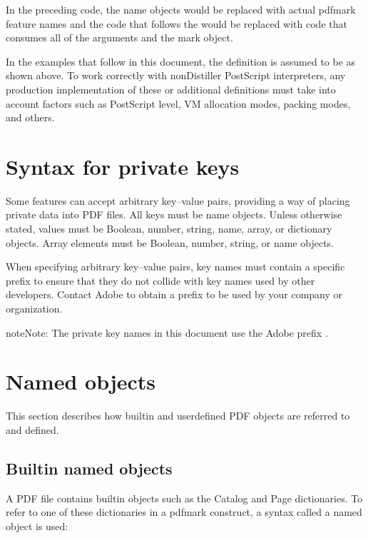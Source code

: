 \documentclass[letterpaper,12pt,english,openany,oneside]{sphinxmanual}
\begin{document}
In the preceding code, the name objects   would be replaced with actual pdfmark feature names and the code that follows the    would be replaced with code that consumes all of the arguments and the mark object.

In the examples that follow in this document, the  definition is assumed to be as shown above. To work correctly with non\sphinxhyphen{}Distiller PostScript interpreters, any production implementation of these or additional definitions must take into account factors such as PostScript level, VM allocation modes, packing modes, and others.


\section{Syntax for private keys}
\label{\detokenize{pdfmark_Syntax:syntax-for-private-keys}}
Some features can accept arbitrary key–value pairs, providing a way of placing private data into PDF files. All keys must be name objects. Unless otherwise stated, values must be Boolean, number, string, name, array, or dictionary objects. Array elements must be Boolean, number, string, or name objects.

When specifying arbitrary key–value pairs, key names must contain a specific prefix to ensure that they do not collide with key names used by other developers. Contact Adobe to obtain a prefix to be used by your company or organization.

\begin{sphinxadmonition}{note}{Note:}
The private key names in this document use the Adobe prefix  .
\end{sphinxadmonition}


\section{Named objects}
\label{\detokenize{pdfmark_Syntax:named-objects}}
This section describes how built\sphinxhyphen{}in and user\sphinxhyphen{}defined PDF objects are referred to and defined.


\subsection{Built\sphinxhyphen{}in named objects}
\label{\detokenize{pdfmark_Syntax:built-in-named-objects}}
A PDF file contains built\sphinxhyphen{}in objects such as the Catalog and Page dictionaries. To refer to one of these dictionaries in a pdfmark construct, a syntax called a named object is used:
\end{document}

